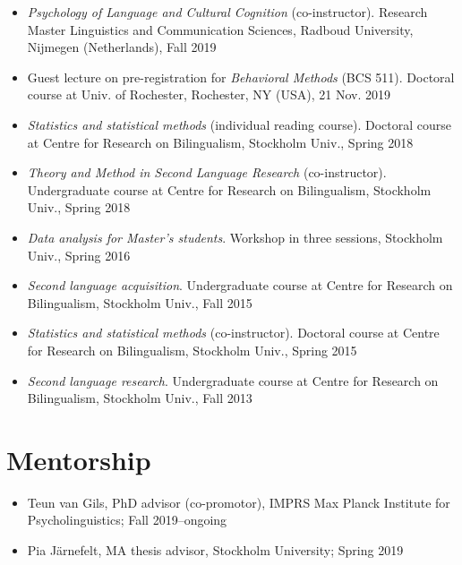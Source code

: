 \documentclass[margin, 11pt]{res} %
\begin{document}
\begin{resume}
\begin{itemize}
\item \textit{Psychology of Language and Cultural Cognition} (co-instructor). Research Master Linguistics and Communication Sciences, Radboud University, Nijmegen (Netherlands), Fall 2019

\item Guest lecture on pre-registration for \textit{Behavioral Methods} (BCS 511). Doctoral course at Univ. of Rochester, Rochester, NY (USA), 21 Nov. 2019

\item \textit{Statistics and statistical methods} (individual reading course). Doctoral course at Centre for Research on Bilingualism, Stockholm Univ., Spring 2018

\item \textit{Theory and Method in Second Language Research} (co-instructor). Undergraduate course at Centre for Research on Bilingualism, Stockholm Univ., Spring 2018

\item \textit{Data analysis for Master's students}. Workshop in three sessions, Stockholm Univ., Spring 2016

\item \textit{Second language acquisition}. Undergraduate course at Centre for Research on Bilingualism, Stockholm Univ., Fall 2015

\item \textit{Statistics and statistical methods} (co-instructor). Doctoral course at Centre for Research on Bilingualism, Stockholm Univ., Spring 2015

\item \textit{Second language research}. Undergraduate course at Centre for Research on Bilingualism, Stockholm Univ., Fall 2013 

\end{itemize}


\section{\sc Mentorship}

\begin{itemize}

\item Teun van Gils, PhD advisor (co-promotor), IMPRS Max Planck Institute for Psycholinguistics; Fall 2019--ongoing

\item Pia J{\"a}rnefelt, MA thesis advisor, Stockholm University; Spring 2019


\end{itemize}
\end{resume}
\end{document}
